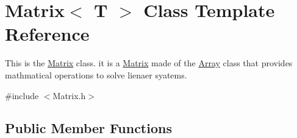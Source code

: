 \hypertarget{classMatrix}{}\section{Matrix$<$ T $>$ Class Template Reference}
\label{classMatrix}


This is the \hyperlink{classMatrix}{Matrix} class. it is a \hyperlink{classMatrix}{Matrix} made of the \hyperlink{classArray}{Array} class that provides mathmatical operations to solve lienaer syatems.  




{\ttfamily \#include $<$Matrix.\+h$>$}

\subsection*{Public Member Functions}
